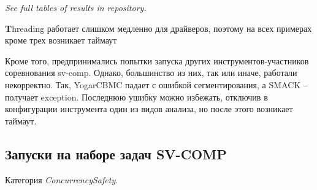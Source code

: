 
{\em See full tables of results in repository.}

{\textbf Threading} работает слишком медленно для драйверов, поэтому на всех примерах кроме трех возникает таймаут 

Кроме того, предпринимались попытки запуска других инструментов-участников соревнования sv-comp. 
Однако, большинство из них, так или иначе, работали некорректно. 
Так, YogarCBMC падает с ошибкой сегментирования, а SMACK -- получает exception. Последнюю ушибку можно избежать, отключив в конфигурации инструмента один из видов анализа, но после этого возникает таймаут.

\subsection{Запуски на наборе задач SV-COMP}
Категория {\em ConcurrencySafety}.



